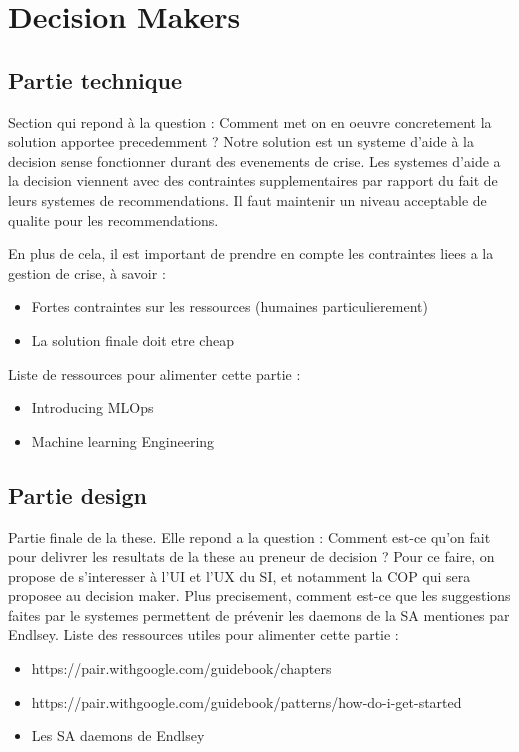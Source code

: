 \chapter*{Decision Makers}

\section{Partie technique}
Section qui repond à la question : Comment met on en oeuvre concretement la solution apportee precedemment ?
Notre solution est un systeme d'aide à la decision sense fonctionner durant des evenements de crise.
Les systemes d'aide a la decision viennent avec des contraintes supplementaires par rapport du fait de leurs systemes de recommendations.
Il faut maintenir un niveau acceptable de qualite pour les recommendations.

En plus de cela, il est important de prendre en compte les contraintes liees a la gestion de crise, à savoir :
\begin{itemize}
    \item Fortes contraintes sur les ressources (humaines particulierement)
    \item La solution finale doit etre cheap
\end{itemize}

Liste de ressources pour alimenter cette partie :
\begin{itemize}
    \item Introducing MLOps
    \item Machine learning Engineering
\end{itemize}


\section{Partie design}
Partie finale de la these.
Elle repond a la question : Comment est-ce qu'on fait pour delivrer les resultats de la these au preneur de decision ?
Pour ce faire, on propose de s'interesser à l'UI et l'UX du SI, et notamment la COP qui sera proposee au decision maker.
Plus precisement, comment est-ce que les suggestions faites par le systemes permettent de prévenir les daemons de la SA mentiones par Endlsey.
Liste des ressources utiles pour alimenter cette partie :
\begin{itemize}
    \item https://pair.withgoogle.com/guidebook/chapters
    \item https://pair.withgoogle.com/guidebook/patterns/how-do-i-get-started
    \item Les SA daemons de Endlsey
\end{itemize}


